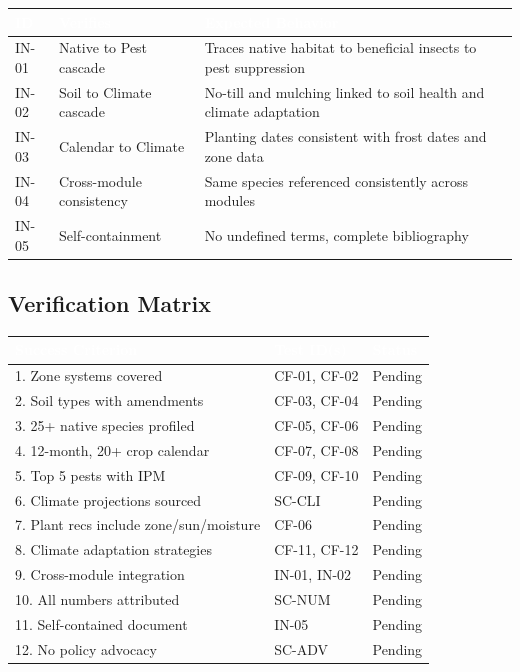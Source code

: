 \documentclass[11pt,letterpaper]{article}
\newcommand{\tableheader}[1]{\textbf{\sffamily\textcolor{white}{#1}}}
\begin{document}
\begin{center}
\begin{tabularx}{\textwidth}{C{1.2cm}L{3.5cm}X}
\toprule
{}
\tableheader{ID} & \tableheader{Verifies} & \tableheader{Expected Behavior} \\
\midrule
IN-01 & Native to Pest cascade & Traces native habitat to beneficial insects to pest suppression \\
IN-02 & Soil to Climate cascade & No-till and mulching linked to soil health and climate adaptation \\
IN-03 & Calendar to Climate & Planting dates consistent with frost dates and zone data \\
IN-04 & Cross-module consistency & Same species referenced consistently across modules \\
IN-05 & Self-containment & No undefined terms, complete bibliography \\
\bottomrule
\end{tabularx}
\end{center}

\subsection{Verification Matrix}

\begin{center}
\begin{tabularx}{\textwidth}{XL{3cm}C{1.5cm}}
\toprule
{}
\tableheader{Success Criterion} & \tableheader{Test ID(s)} & \tableheader{Status} \\
. Zone systems covered & CF-01, CF-02 & Pending \\
2. Soil types with amendments & CF-03, CF-04 & Pending \\
3. 25+ native species profiled & CF-05, CF-06 & Pending \\
4. 12-month, 20+ crop calendar & CF-07, CF-08 & Pending \\
5. Top 5 pests with IPM & CF-09, CF-10 & Pending \\
6. Climate projections sourced & SC-CLI & Pending \\
7. Plant recs include zone/sun/moisture & CF-06 & Pending \\
8. Climate adaptation strategies & CF-11, CF-12 & Pending \\
9. Cross-module integration & IN-01, IN-02 & Pending \\
10. All numbers attributed & SC-NUM & Pending \\
11. Self-contained document & IN-05 & Pending \\
12. No policy advocacy & SC-ADV & Pending \\
\bottomrule
\end{tabularx}
\end{center}
\end{document}
